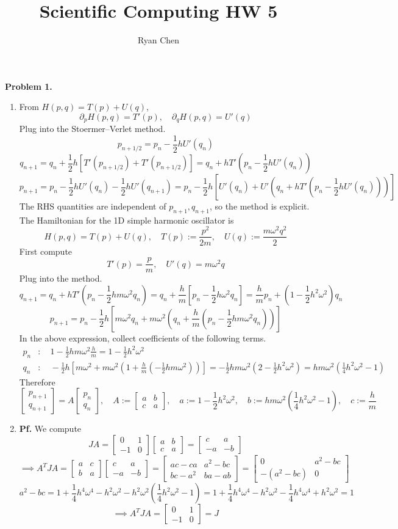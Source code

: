 \documentclass{article}
\title{Scientific Computing HW 5}
\author{Ryan Chen}
\def\tbf#1{\textbf{#1}}
\newcommand{\br}[1]{\left(#1\right)}
\newcommand{\sbr}[1]{\left[#1\right]}
\newcommand{\m}[2][b]{\begin{#1matrix}#2\end{#1matrix}}
\newcommand{\pf}{\tbf{Pf. }}
\newcommand{\imp}{\implies}
\newcommand{\ptl}{\partial}
\newcommand{\om}{\omega}
\begin{document}
	
\maketitle



\tbf{Problem 1.}

\begin{enumerate}
	
\item From $H(p,q)=T(p)+U(q)$,
$$\ptl_pH(p,q) = T'(p),
\quad \ptl_qH(p,q) = U'(q)$$
Plug into the Stoermer--Verlet method.
$$p_{n+1/2} = p_n - \frac12hU'(q_n)$$
$$q_{n+1} = q_n + \frac12h[T'(p_{n+1/2}) + T'(p_{n+1/2})]
= q_n + hT'\br{p_n - \frac12hU'(q_n)}$$
$$p_{n+1} = p_n - \frac12hU'(q_n) - \frac12hU'(q_{n+1})
= p_n - \frac12h\sbr{U'(q_n) + U'\br{q_n + hT'\br{p_n - \frac12hU'(q_n)}}}$$
The RHS quantities are independent of $p_{n+1},q_{n+1}$, so the method is explicit.\\

The Hamiltonian for the 1D simple harmonic oscillator is
$$H(p,q) = T(p) + U(q),
\quad T(p) := \frac{p^2}{2m},
\quad U(q) := \frac{m\om^2q^2}{2}$$
First compute
$$T'(p) = \frac pm,
\quad U'(q) = m\om^2q$$
Plug into the method.
$$q_{n+1} = q_n + hT'\br{p_n - \frac12hm\om^2q_n}
= q_n + \frac hm\sbr{p_n - \frac12h\om^2q_n}
= \frac hmp_n + \br{1 - \frac12h^2\om^2}q_n$$
$$p_{n+1} = p_n - \frac12h\sbr{m\om^2q_n + m\om^2\br{q_n + \frac hm\br{p_n - \frac12hm\om^2q_n}}}$$
In the above expression, collect coefficients of the following terms.
\begin{align*}
	p_n &: \quad 1 - \frac12hm\om^2\frac hm = 1 - \frac12h^2\om^2 \\
	q_n &: \quad -\frac12h\sbr{m\om^2 + m\om^2\br{1+ \frac hm\br{-\frac12hm\om^2}}}
	= -\frac12hm\om^2\br{2 - \frac12h^2\om^2}
	= hm\om^2\br{\frac14h^2\om^2 - 1}
\end{align*}
Therefore
$$\m{p_{n+1} \\ q_{n+1}} = A\m{p_n \\ q_n},
\quad A := \m{a & b \\ c & a},
\quad a := 1 - \frac12h^2\om^2,
\quad b := hm\om^2\br{\frac14h^2\om^2 - 1},
\quad c := \frac hm$$


\item \pf We compute
$$JA = \m{0 & 1 \\ -1 & 0}\m{a & b \\ c & a}
= \m{c & a \\ -a & -b}$$
$$\imp A^TJA = \m{a & c \\ b & a}\m{c & a \\ -a & -b}
= \m{ac-ca & a^2-bc \\ bc-a^2 & ba-ab}
= \m{0 & a^2-bc \\ -(a^2-bc) & 0}$$
$$a^2 - bc = 1 + \frac14h^4\om^4 - h^2\om^2 - h^2\om^2\br{\frac14h^2\om^2 - 1}
= 1 + \frac14h^4\om^4 - h^2\om^2 - \frac14h^4\om^4 + h^2\om^2
= 1$$
$$\imp A^TJA = \m{0 & 1 \\ -1 & 0} = J$$



\end{enumerate}
\end{document}
